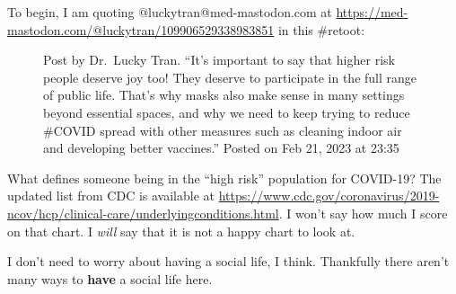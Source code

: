 To begin, I am quoting @luckytran@med-mastodon.com at
\url{https://med-mastodon.com/@luckytran/109906529338983851} in this
\#retoot:

\begin{figure}
\centering
{}
\caption{Post by Dr.~Lucky Tran. ``It's important to say that higher
risk people deserve joy too! They deserve to participate in the full
range of public life. That's why masks also make sense in many settings
beyond essential spaces, and why we need to keep trying to reduce
\#COVID spread with other measures such as cleaning indoor air and
developing better vaccines.'' Posted on Feb 21, 2023 at 23:35}
\end{figure}

What defines someone being in the ``high risk'' population for COVID-19?
The updated list from CDC is available at
\url{https://www.cdc.gov/coronavirus/2019-ncov/hcp/clinical-care/underlyingconditions.html}.
I won't say how much I score on that chart. I \emph{will} say that it is
not a happy chart to look at.

I don't need to worry about having a social life, I think. Thankfully
there aren't many ways to \textbf{have} a social life here.
